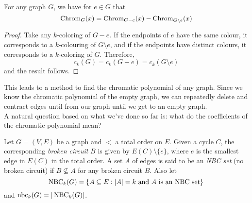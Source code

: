 	\begin{fprop}
		\label{prop: deletion contraction recurrence}
		For any graph $G$, we have for $e \in G$ that
		\[ \operatorname{Chrom}_G(x) = \operatorname{Chrom}_{G-e}(x) - \operatorname{Chrom}_{G\setminus e}(x) \]
	\end{fprop}
	\begin{proof}
		Take any $k$-coloring of $G-e$. If the endpoints of $e$ have the same colour, it corresponds to a $k$-colouring of $G\setminus e$, and if the endpoints have distinct colours, it corresponds to a $k$-coloring of $G$. Therefore,
		\[ c_k(G) = c_k(G-e) = c_k(G\setminus e) \]
		and the result follows.
	\end{proof}
	This leads to a method to find the chromatic polynomial of any graph. Since we know the chromatic polynomial of the empty graph, we can repeatedly delete and contract edges until from our graph until we get to an empty graph.\\
	A natural question based on what we've done so far is: what do the coefficients of the chromatic polynomial mean?

	\begin{fdef}
		Let $G = (V,E)$ be a graph and $<$ a total order on $E$. Given a cycle $C$, the corresponding \emph{broken circuit} $B$ is given by $E(C) \setminus \{e\}$, where $e$ is the smallest edge in $E(C)$ in the total order. A set $A$ of edges is said to be an \emph{NBC set} (no broken circuit) if $B \not\subseteq A$ for any broken circuit $B$. Also let
		\[ \operatorname{NBC}_k(G) = \{ A \subseteq E : |A| = k \text{ and $A$ is an NBC set} \} \]
		and $\operatorname{nbc}_k(G) = |\operatorname{NBC}_k(G)|$.\\
	\end{fdef}

